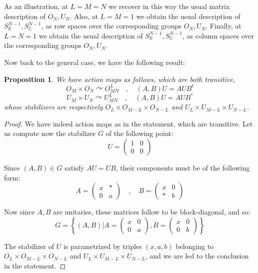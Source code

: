 \documentclass[12pt]{amsbook}
\newtheorem{proposition}[theorem]{Proposition}
\begin{document}
As an illustration, at $L=M=N$ we recover in this way the usual matrix description of $O_N,U_N$. Also, at $L=M=1$ we obtain the usual description of $S^{N-1}_\mathbb R,S^{N-1}_\mathbb C$, as row spaces over the corresponding groups $O_N,U_N$. Finally, at $L=N=1$ we obtain the usual description of $S^{N-1}_\mathbb R,S^{N-1}_\mathbb C$, as column spaces over the corresponding groups $O_N,U_N$. 

\bigskip

Now back to the general case, we have the following result:

\begin{proposition}
We have action maps as follows, which are both transitive,
$$O_M\times O_N\curvearrowright O_{MN}^L\quad,\quad 
(A,B)U=AUB^t$$
$$U_M\times U_N\curvearrowright U_{MN}^L\quad,\quad 
(A,B)U=AUB^*$$
whose stabilizers are respectively $O_L\times O_{M-L}\times O_{N-L}$ and $U_L\times U_{M-L}\times U_{N-L}$.
\end{proposition}

\begin{proof}
We have indeed action maps as in the statement, which are transitive. Let us compute now the stabilizer $G$ of the following point:
$$U=\begin{pmatrix}1&0\\0&0\end{pmatrix}$$

Since $(A,B)\in G$ satisfy $AU=UB$, their components must be of the following form:
$$A=\begin{pmatrix}x&*\\0&a\end{pmatrix}\quad,\quad 
B=\begin{pmatrix}x&0\\ *&b\end{pmatrix}$$

Now since $A,B$ are unitaries, these matrices follow to be block-diagonal, and so:
$$G=\left\{(A,B)\Big|A=\begin{pmatrix}x&0\\0&a\end{pmatrix},B=\begin{pmatrix}x&0\\ 0&b\end{pmatrix}\right\}$$

The stabilizer of $U$ is parametrized by triples $(x,a,b)$ belonging to $O_L\times O_{M-L}\times O_{N-L}$ and $U_L\times U_{M-L}\times U_{N-L}$, and we are led to the conclusion in the statement.
\end{proof}
\end{document}
